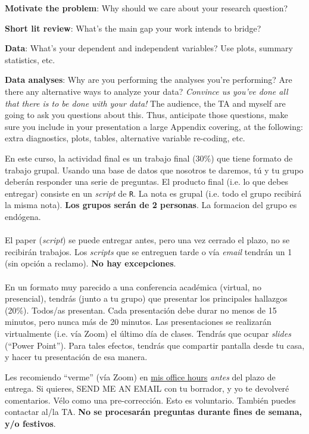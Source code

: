 \documentclass[letterpaper]{article}
\renewenvironment{itemize}{
  \begin{list}{}{
    \setlength{\leftmargin}{1.5em}
  }
}{
  \end{list}
}
\begin{document}
\begin{enumerate}
\begin{itemize}
  \item[$\diamond$] {\bf Motivate the problem}: Why should we care about your research question?
  \item[$\diamond$] {\bf Short lit review}: What's the main gap your work intends to bridge?
  \item[$\diamond$] {\bf Data}: What's your dependent and independent variables? Use plots, summary statistics, etc.
  \item[$\diamond$] {\bf Data analyses}: Why are you performing the analyses you're performing? Are there any alternative ways to analyze your data? \emph{Convince us you've done all that there is to be done with your data!} The audience, the TA and myself are going to ask you questions about this. Thus, anticipate those questions, make sure you include in your presentation a large Appendix covering, at the following: extra diagnostics, plots, tables, alternative variable re-coding, etc.
  \item[$\diamond$] 
  
\end{itemize}

En este curso, la actividad final es un trabajo final (30\%) que tiene formato de trabajo grupal. Usando una base de datos que nosotros te daremos, t\'u y tu grupo deber\'an responder una serie de preguntas. El producto final (i.e. lo que debes entregar) consiste en un \emph{script} de \texttt{R}. La nota es grupal (i.e. todo el grupo recibir\'a la misma nota). {\bf Los grupos ser\'an de 2 personas}. La formacion del grupo es end\'ogena.
\\
\\
El paper (\emph{script}) se puede entregar antes, pero una vez cerrado el plazo, no se recibir\'an trabajos. Los \emph{scripts} que se entreguen tarde o v\'ia \emph{email} tendr\'an un 1 (sin opci\'on a reclamo). {\bf No hay excepciones}. 
\\
\\
En un formato muy parecido a una conferencia acad\'emica (virtual, no presencial), tendr\'as (junto a tu grupo) que presentar los principales hallazgos (20\%). Todos/as presentan. Cada presentaci\'on debe durar no menos de 15 minutos, pero nunca m\'as de 20 minutos. Las presentaciones se realizar\'an virtualmente (i.e. v\'ia Zoom) el \'ultimo d\'ia de clases. Tendr\'as que ocupar \emph{slides} (``Power Point''). Para tales efectos, tendr\'as que compartir pantalla desde tu casa, y hacer tu presentaci\'on de esa manera.



Les recomiendo ``verme'' (v\'ia Zoom) en \href{https://calendly.com/bahamonde/officehours}{mis office hours} \emph{antes} del plazo de entrega. Si quieres, SEND ME AN EMAIL con tu borrador, y yo te devolver\'e comentarios. V\'elo como una pre-correcci\'on. Esto es voluntario. Tambi\'en puedes contactar al/la TA. {\bf No se procesar\'an preguntas durante fines de semana, y/o festivos}.


\end{enumerate}
\end{document}

